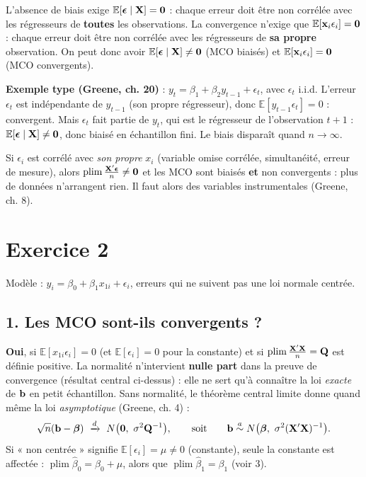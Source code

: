 \documentclass[11pt,a4paper]{article}
\newcommand{\vbeta}{\bm{\beta}}\newcommand{\veps}{\bm{\epsilon}}\newcommand{\Q}{\mathbf{Q}}
\newcommand{\E}{\mathbb{E}}\newcommand{\Var}{\operatorname{Var}}\newcommand{\Cov}{\operatorname{Cov}}
\newcommand{\plim}{\operatorname{plim}}
\begin{document}
\begin{reponse}
L'absence de biais exige $\E[\veps\mid\vX]=\mathbf 0$ : chaque erreur doit être non corrélée avec les régresseurs de \textbf{toutes} les observations. La convergence n'exige que $\E[\vx_i\epsilon_i]=\mathbf 0$ : chaque erreur doit être non corrélée avec les régresseurs de \textbf{sa propre} observation. On peut donc avoir $\E[\veps\mid\vX]\neq\mathbf 0$ (MCO biaisés) et $\E[\vx_i\epsilon_i]=\mathbf 0$ (MCO convergents).

\textbf{Exemple type (Greene, ch. 20)} : $y_t=\beta_1+\beta_2y_{t-1}+\epsilon_t$, avec $\epsilon_t$ i.i.d. L'erreur $\epsilon_t$ est indépendante de $y_{t-1}$ (son propre régresseur), donc $\E[y_{t-1}\epsilon_t]=0$ : convergent. Mais $\epsilon_t$ fait partie de $y_t$, qui est le régresseur de l'observation $t+1$ : $\E[\veps\mid\vX]\neq\mathbf 0$, donc biaisé en échantillon fini. Le biais disparaît quand $n\to\infty$.
\end{reponse}

\begin{attention}
Si $\epsilon_i$ est corrélé avec \emph{son propre} $x_i$ (variable omise corrélée, simultanéité, erreur de mesure), alors $\plim\frac{\vX'\veps}{n}\neq\mathbf 0$ et les MCO sont biaisés \textbf{et} non convergents : plus de données n'arrangent rien. Il faut alors des variables instrumentales (Greene, ch. 8).
\end{attention}

\section{Exercice 2}

Modèle : $y_i=\beta_0+\beta_1x_{1i}+\epsilon_i$, erreurs qui ne suivent pas une loi normale centrée.

\subsection*{1. Les MCO sont-ils convergents ?}

\begin{reponse}
\textbf{Oui}, si $\E[x_{1i}\epsilon_i]=0$ (et $\E[\epsilon_i]=0$ pour la constante) et si $\plim\frac{\vX'\vX}{n}=\Q$ est définie positive. La normalité n'intervient \textbf{nulle part} dans la preuve de convergence (résultat central ci-dessus) : elle ne sert qu'à connaître la loi \emph{exacte} de $\mathbf{b}$ en petit échantillon. Sans normalité, le théorème central limite donne quand même la loi \emph{asymptotique} (Greene, ch. 4) :
\[
\sqrt n(\vb-\vbeta)\ \xrightarrow{d}\ N\big(\mathbf 0,\ \sigma^2\Q^{-1}\big),\qquad\text{soit}\qquad \vb\overset{a}{\sim}N\big(\vbeta,\ \sigma^2(\vX'\vX)^{-1}\big).
\]
Si « non centrée » signifie $\E[\epsilon_i]=\mu\neq0$ (constante), seule la constante est affectée : $\plim\hat\beta_0=\beta_0+\mu$, alors que $\plim\hat\beta_1=\beta_1$ (voir 3).
\end{reponse}
\end{document}
